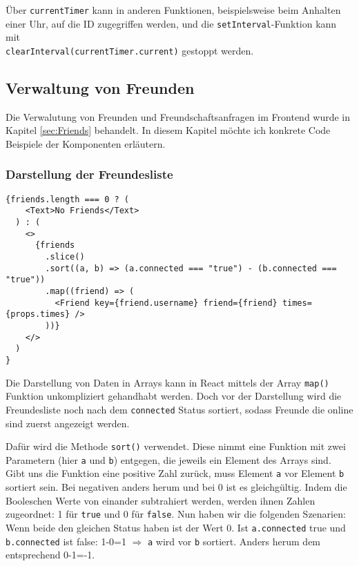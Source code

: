 Über \verb|currentTimer| kann in anderen Funktionen, beispielsweise beim Anhalten einer Uhr, auf die ID zugegriffen werden, und die \verb|setInterval|-Funktion kann mit \\ \verb|clearInterval(currentTimer.current)| gestoppt werden.

\subsection{Verwaltung von Freunden}
Die Verwalutung von Freunden und Freundschaftsanfragen im Frontend wurde in Kapitel \ref{sec:Friends} behandelt. In diesem Kapitel möchte ich konkrete Code Beispiele der Komponenten erläutern.

\subsubsection{Darstellung der Freundesliste}
\begin{lstlisting}[style=codeStyle, caption={Darstellung der Freundesliste in \textit{FriendList}}, label={lst:FriendList}]
{friends.length === 0 ? (
    <Text>No Friends</Text>
  ) : (
    <>
      {friends
        .slice()
        .sort((a, b) => (a.connected === "true") - (b.connected === "true"))
        .map((friend) => (
          <Friend key={friend.username} friend={friend} times={props.times} />
        ))}
    </>
  )
}
\end{lstlisting}

Die Darstellung von Daten in Arrays kann in React mittels der Array \verb|map()| Funktion unkompliziert gehandhabt werden. Doch vor der Darstellung wird die Freundesliste noch nach dem \verb|connected| Status sortiert, sodass Freunde die online sind zuerst angezeigt werden.

Dafür wird die Methode \verb|sort()| verwendet. Diese nimmt eine Funktion mit zwei Parametern (hier \verb|a| und \verb|b|) entgegen, die jeweils ein Element des Arrays sind. Gibt uns die Funktion eine positive Zahl zurück, muss Element \verb|a| vor Element \verb|b| sortiert sein. Bei negativen anders herum und bei 0 ist es gleichgültig. Indem die Booleschen Werte von einander subtrahiert werden, werden ihnen Zahlen zugeordnet: 1 für \verb|true| und 0 für \verb|false|. Nun haben wir die folgenden Szenarien: Wenn beide den gleichen Status haben ist der Wert 0. Ist \verb|a.connected| true und \verb|b.connected| ist false: 1-0=1 $\Rightarrow$ \verb|a| wird vor \verb|b| sortiert. Anders herum dem entsprechend 0-1=-1.

